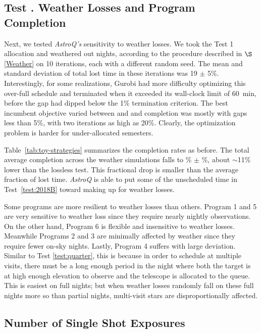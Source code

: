 \documentclass[twocolumn,linenumbers]{aastex63}
\newcommand{\AstroQ}{\textit{AstroQ}\xspace}
\begin{document}
\label{test:weather}
\subsection{Test . Weather Losses and Program Completion}
\label{sec:weather-loss}
Next, we tested {\em AstroQ's} sensitivity to weather losses. We took the Test 1 allocation and weathered out nights, according to the procedure described in $\S$\ref{Weather} on 10 iterations, each with a different random seed. The mean and standard deviation of total lost time in these iterations was 19 $\pm$ 5\%. Interestingly, for some realizations, Gurobi had more difficulty optimizing this over-full schedule and terminated when it exceeded its wall-clock limit of 60~min, before the gap had dipped below the 1\% termination criterion. The best incumbent objective varied between  and  and completion was mostly with gaps less than 5\%, with two iterations as high as 20\%. Clearly, the optimization problem is harder for under-allocated semesters. 

Table~\ref{tab:toy-strategies} summarizes the completion rates as before. The total average completion across the weather simulations falls to \% $\pm$ \%, about $\sim$11\% lower than the lossless test. This fractional drop is smaller than the average fraction of lost time. \AstroQ is able to put some of the unscheduled time in Test~\ref{test:2018B} toward making up for weather losses.

Some programs are more resilient to weather losses than others. Program 1 and 5 are very sensitive to weather loss since they require nearly nightly observations. On the other hand, Program 6 is flexible and insensitive to weather losses. Meanwhile Programs 2 and 3 are minimally affected by weather since they require fewer on-sky nights. Lastly, Program 4 suffers with large deviation. Similar to Test \ref{test:quarter}, this is because in order to schedule at multiple visits, there must be a long enough period in the night where both the target is at high enough elevation to observe and the telescope is allocated to the queue. This is easiest on full nights; but when weather losses randomly fall on these full nights more so than partial nights, multi-visit stars are disproportionally affected.

\subsection{Number of Single Shot Exposures}
\label{sec:test-single-shot}
\end{document}
